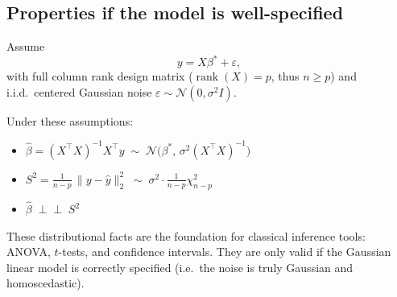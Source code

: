 \subsection*{Properties if the model is well-specified}

Assume
\[
y = X\beta^\ast + \varepsilon,
\]
with full column rank design matrix ($\operatorname{rank}(X)=p$,
thus $n \geq p$) and i.i.d.\ centered Gaussian noise
$\varepsilon \sim \mathcal{N}(0,\sigma^2 I)$.

\begin{proposition}
  Under these assumptions:
  \begin{itemize}
  \item $\hat\beta = (X^\top X)^{-1}X^\top y 
  \;\sim\; \mathcal{N}\!\big(\beta^\ast,\, \sigma^2 (X^\top X)^{-1}\big)$
  \item $S^2 = \frac{1}{n-p}\,\|y - \hat y\|_2^2 
  \;\sim\; \sigma^2 \cdot \frac{1}{n-p}\chi^2_{n-p}$
  \item $\hat\beta \;\perp\!\!\!\perp\; S^2$
  \end{itemize}
\end{proposition}

\begin{remark}
These distributional facts are the foundation for classical inference tools:
ANOVA, $t$-tests, and confidence intervals. They are only valid
if the Gaussian linear model is correctly specified
(i.e.\ the noise is truly Gaussian and homoscedastic).
\end{remark}